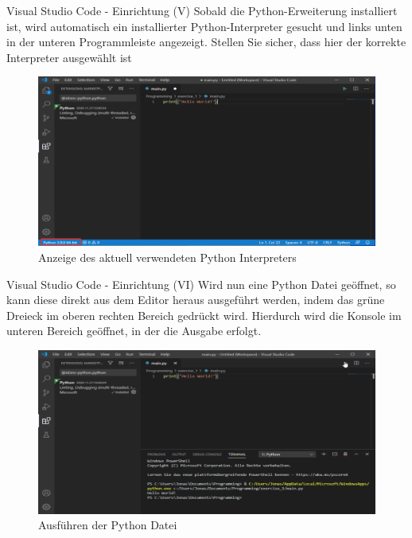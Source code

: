     \begin{frame}{Visual Studio Code - Einrichtung (V)}
        Sobald die Python-Erweiterung installiert ist, wird automatisch ein installierter Python-Interpreter gesucht und links unten in der unteren Programmleiste angezeigt. Stellen Sie sicher, dass hier der korrekte Interpreter ausgewählt ist
        
        \begin{figure}
            \centering
            \includegraphics[keepaspectratio, width=0.9\linewidth]{chapters/08_ide/figures/vs_code_python_interpreter.png}
            \caption{Anzeige des aktuell verwendeten Python Interpreters}
        \end{figure}
        
    \end{frame}
    
        \begin{frame}{Visual Studio Code - Einrichtung (VI)}
        Wird nun eine Python Datei geöffnet, so kann diese direkt aus dem Editor heraus ausgeführt werden, indem das grüne Dreieck im oberen rechten Bereich gedrückt wird. Hierdurch wird die Konsole im unteren Bereich geöffnet, in der die Ausgabe erfolgt.
        
        \begin{figure}
            \centering
            \includegraphics[keepaspectratio, width=0.9\linewidth]{chapters/08_ide/figures/vs_code_python_run.png}
            \caption{Ausführen der Python Datei}
        \end{figure}
        
    \end{frame}
    
